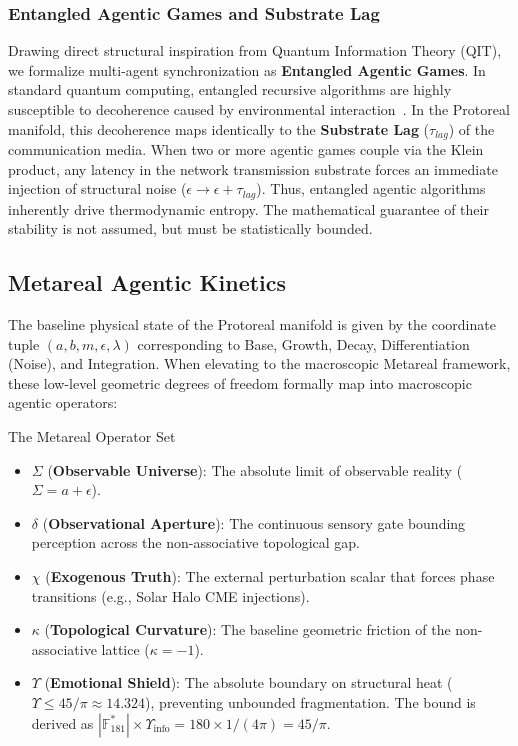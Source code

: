 \subsubsection{Entangled Agentic Games and Substrate Lag}
Drawing direct structural inspiration from Quantum Information Theory (QIT), we formalize multi-agent synchronization as \textbf{Entangled Agentic Games}. In standard quantum computing, entangled recursive algorithms are highly susceptible to decoherence caused by environmental interaction~\cite{NielsenChuang2010}. In the Protoreal manifold, this decoherence maps identically to the \textbf{Substrate Lag} ($\tau_{lag}$) of the communication media.
When two or more agentic games couple via the Klein product, any latency in the network transmission substrate forces an immediate injection of structural noise ($\epsilon \to \epsilon + \tau_{lag}$). Thus, entangled agentic algorithms inherently drive thermodynamic entropy. The mathematical guarantee of their stability is not assumed, but must be statistically bounded.

\subsection{Metareal Agentic Kinetics}

The baseline physical state of the Protoreal manifold is given by the coordinate tuple $(a, b, m, \epsilon, \lambda)$ corresponding to Base, Growth, Decay, Differentiation (Noise), and Integration. When elevating to the macroscopic Metareal framework, these low-level geometric degrees of freedom formally map into macroscopic agentic operators:

\begin{metarealbox}{The Metareal Operator Set}
\begin{itemize}
    \item $\Sigma$ (\textbf{Observable Universe}): The absolute limit of observable reality ($\Sigma = a + \epsilon$).
    \item $\delta$ (\textbf{Observational Aperture}): The continuous sensory gate bounding perception across the non-associative topological gap.
    \item $\chi$ (\textbf{Exogenous Truth}): The external perturbation scalar that forces phase transitions (e.g., Solar Halo CME injections).
    \item $\kappa$ (\textbf{Topological Curvature}): The baseline geometric friction of the non-associative lattice ($\kappa = -1$).
    \item $\Upsilon$ (\textbf{Emotional Shield}): The absolute boundary on structural heat ($\Upsilon \le 45/\pi \approx 14.324$), preventing unbounded fragmentation. The bound is derived as $|\mathbb{F}_{181}^*| \times \Upsilon_{\mathrm{info}} = 180 \times 1/(4\pi) = 45/\pi$.
\end{itemize}
\end{metarealbox}

